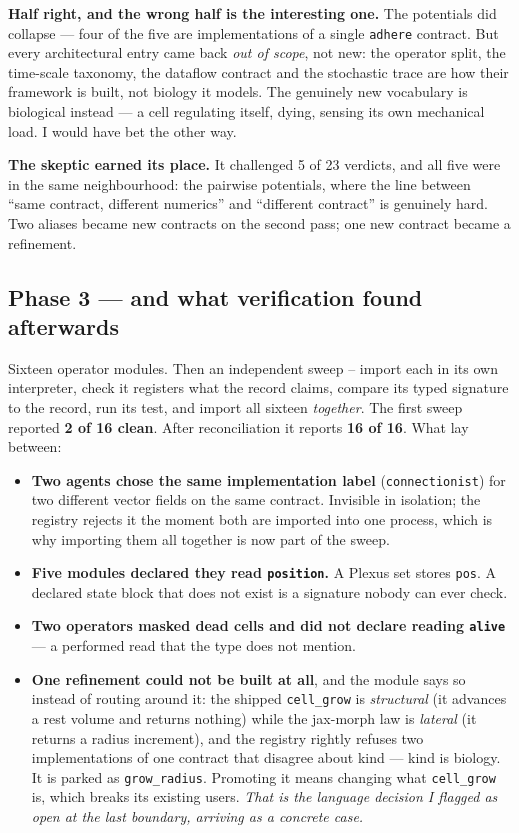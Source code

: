 \documentclass[11pt,a4paper]{article}
\newcommand{\code}[1]{\texttt{#1}}
\begin{document}
\textbf{Half right, and the wrong half is the interesting one.} The potentials did collapse ---
four of the five are implementations of a single \code{adhere} contract. But every architectural
entry came back \emph{out of scope}, not new: the operator split, the time-scale taxonomy, the
dataflow contract and the stochastic trace are how their framework is built, not biology it
models. The genuinely new vocabulary is biological instead --- a cell regulating itself, dying,
sensing its own mechanical load. I would have bet the other way.

\textbf{The skeptic earned its place.} It challenged 5 of 23 verdicts, and all five were in the
same neighbourhood: the pairwise potentials, where the line between ``same contract, different
numerics'' and ``different contract'' is genuinely hard. Two aliases became new contracts on the
second pass; one new contract became a refinement.

\subsection{Phase 3 --- and what verification found afterwards}

Sixteen operator modules. Then an independent sweep -- import each in its own interpreter, check
it registers what the record claims, compare its typed signature to the record, run its test, and
import all sixteen \emph{together}. The first sweep reported \textbf{2 of 16 clean}. After
reconciliation it reports \textbf{16 of 16}. What lay between:

\begin{itemize}
\item \textbf{Two agents chose the same implementation label} (\code{connectionist}) for two
different vector fields on the same contract. Invisible in isolation; the registry rejects it the
moment both are imported into one process, which is why importing them all together is now part
of the sweep.
\item \textbf{Five modules declared they read \code{position}.} A Plexus set stores \code{pos}. A
declared state block that does not exist is a signature nobody can ever check.
\item \textbf{Two operators masked dead cells and did not declare reading \code{alive}} --- a
performed read that the type does not mention.
\item \textbf{One refinement could not be built at all}, and the module says so instead of routing
around it: the shipped \code{cell\_grow} is \emph{structural} (it advances a rest volume and
returns nothing) while the jax-morph law is \emph{lateral} (it returns a radius increment), and
the registry rightly refuses two implementations of one contract that disagree about kind ---
kind is biology. It is parked as \code{grow\_radius}. Promoting it means changing what
\code{cell\_grow} is, which breaks its existing users. \emph{That is the language decision I
flagged as open at the last boundary, arriving as a concrete case.}
\end{itemize}
\end{document}
